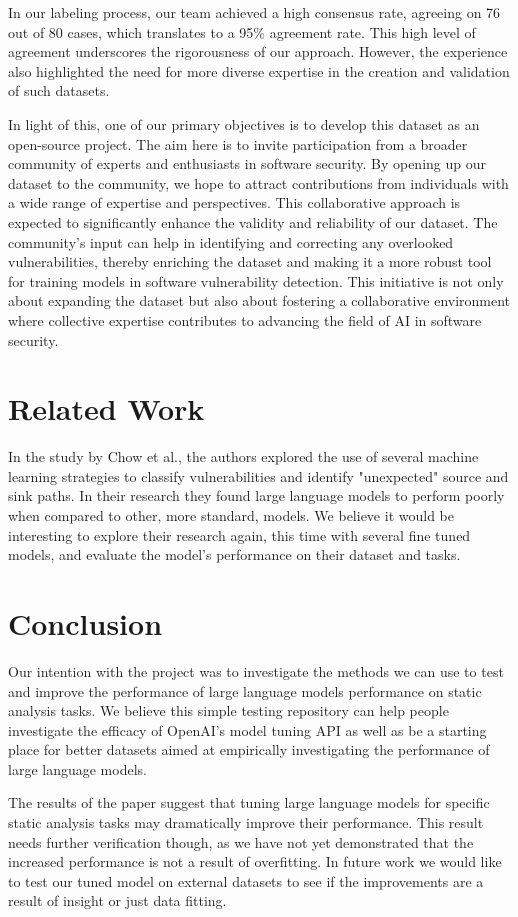 \documentclass[acmsmall]{acmart}
\begin{document}
In our labeling process, our team achieved a high consensus rate, agreeing on 76 out of 80 cases, which translates to a 95\% agreement rate. This high level of agreement underscores the rigorousness of our approach. However, the experience also highlighted the need for more diverse expertise in the creation and validation of such datasets.

In light of this, one of our primary objectives is to develop this dataset as an open-source project. The aim here is to invite participation from a broader community of experts and enthusiasts in software security. By opening up our dataset to the community, we hope to attract contributions from individuals with a wide range of expertise and perspectives. This collaborative approach is expected to significantly enhance the validity and reliability of our dataset. The community's input can help in identifying and correcting any overlooked vulnerabilities, thereby enriching the dataset and making it a more robust tool for training models in software vulnerability detection. This initiative is not only about expanding the dataset but also about fostering a collaborative environment where collective expertise contributes to advancing the field of AI in software security.

\section{Related Work}

In the study by Chow et al.\cite{Chow23}, the authors explored the use of several machine learning strategies to classify vulnerabilities and identify "unexpected" source and sink paths. In their research they found large language models to perform poorly when compared to other, more standard, models. We believe it would be interesting to explore their research again, this time with several fine tuned models, and evaluate the model's performance on their dataset and tasks.

\section{Conclusion}
Our intention with the project was to investigate the methods we can use to test and improve the performance of large language models performance on static analysis tasks. We believe this simple testing repository can help people investigate the efficacy of OpenAI's model tuning API as well as be a starting place for better datasets aimed at empirically investigating the performance of large language models.

The results of the paper suggest that tuning large language models for specific static analysis tasks may dramatically improve their performance. This result needs further verification though, as we have not yet demonstrated that the increased performance is not a result of overfitting. In future work we would like to test our tuned model on external datasets to see if the improvements are a result of insight or just data fitting. 




\end{document}
